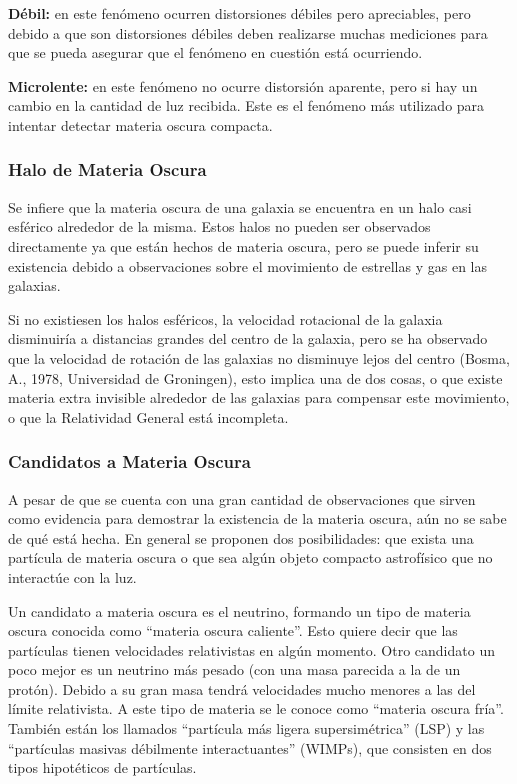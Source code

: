 \documentclass{article}
\begin{document}
 \textbf{D\'ebil:} en este fen\'omeno ocurren distorsiones d\'ebiles pero apreciables, pero debido a que son distorsiones d\'ebiles deben realizarse muchas mediciones para que se pueda asegurar que el fen\'omeno en cuesti\'on est\'a ocurriendo.

 \textbf{Microlente:} en este fen\'omeno no ocurre distorsi\'on aparente, pero si hay un cambio en la cantidad de luz recibida. Este es el fen\'omeno m\'as utilizado para intentar detectar materia oscura compacta.



\subsubsection*{Halo de Materia Oscura}
Se infiere que la materia oscura de una galaxia se encuentra en un halo casi esf\'erico alrededor de la misma. Estos halos no pueden ser observados directamente ya que est\'an hechos de materia oscura, pero se puede inferir su existencia debido a observaciones sobre el movimiento de estrellas y gas en las galaxias.

Si no existiesen los halos esf\'ericos, la velocidad rotacional de la galaxia disminuir\'ia a distancias grandes del centro de la galaxia, pero se ha observado que la velocidad de rotaci\'on de las galaxias no disminuye lejos del centro (Bosma, A., 1978, Universidad de Groningen), esto implica una de dos cosas, o que existe materia extra invisible alrededor de las galaxias para compensar este movimiento, o que la Relatividad General est\'a incompleta.

\subsubsection*{Candidatos a Materia Oscura}
A pesar de que se cuenta con una gran cantidad de observaciones que sirven como evidencia para demostrar la existencia de la materia oscura, a\'un no se sabe de qu\'e est\'a hecha. En general se proponen dos posibilidades: que exista una part\'icula de materia oscura o que sea alg\'un objeto compacto astrof\'isico  que no interact\'ue con la luz.

Un candidato a materia oscura es el neutrino, formando un tipo de materia oscura conocida como ``materia oscura caliente''. Esto quiere decir que las part\'iculas tienen velocidades relativistas en alg\'un momento. Otro candidato un poco mejor es un neutrino m\'as pesado (con una masa parecida a la de un prot\'on). Debido a su gran masa tendr\'a velocidades mucho menores a las del l\'imite relativista. A este tipo de materia se le conoce como ``materia oscura fr\'ia''. Tambi\'en est\'an los llamados ``part\'icula m\'as ligera supersim\'etrica'' (LSP) y las ``part\'iculas masivas d\'ebilmente interactuantes'' (WIMPs), que consisten en dos tipos hipot\'eticos de part\'iculas.
\end{document}
